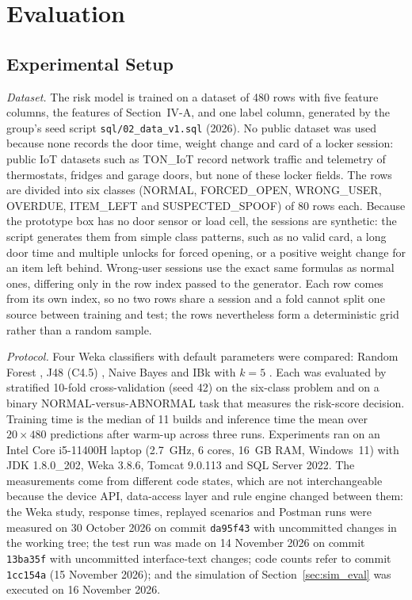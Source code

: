 \documentclass[journal,onecolumn]{IEEEtran}
\newcommand{\baselinecommit}{da95f43}
\newcommand{\revisioncommit}{1cc154a}
\begin{document}
\section{Evaluation}
\label{sec:ml}

\subsection{Experimental Setup}

\textit{Dataset.} The risk model is trained on a dataset of 480 rows with five feature columns, the features of
Section~IV-A, and one label column, generated by the group's seed script \texttt{sql/02\_data\_v1.sql} (2026). No
public dataset was used because none records the door time, weight change and card of a locker session: public IoT
datasets such as TON\_IoT \cite{moustafa2021toniot} record network traffic and telemetry of thermostats, fridges and
garage doors, but none of these locker fields. The rows are divided into six classes (NORMAL, FORCED\_OPEN,
WRONG\_USER, OVERDUE, ITEM\_LEFT and SUSPECTED\_SPOOF) of 80 rows each. Because the prototype box has no door sensor or
load cell, the sessions are synthetic: the script generates them from simple class patterns, such as no valid card, a
long door time and multiple unlocks for forced opening, or a positive weight change for an item left behind. Wrong-user
sessions use the exact same formulas as normal ones, differing only in the row index passed to the generator. Each
row comes from its own index, so no two rows share a session and a fold cannot split one source between training and
test; the rows nevertheless form a deterministic grid rather than a random sample.

\textit{Protocol.} Four Weka classifiers with default parameters were compared: Random Forest \cite{breiman2001rf},
J48 (C4.5) \cite{quinlan1993c45}, Naive Bayes \cite{john1995nb} and IBk with $k = 5$ \cite{aha1991ibl}. Each was
evaluated by stratified 10-fold cross-validation \cite{kohavi1995cv} (seed 42) on the six-class problem and on a binary
NORMAL-versus-ABNORMAL task that measures the risk-score decision. Training time is the median of 11 builds and
inference time the mean over $20 \times 480$ predictions after warm-up across three runs. Experiments ran on an Intel
Core i5-11400H laptop (2.7~GHz, 6 cores, 16~GB RAM, Windows~11) with JDK 1.8.0\_202, Weka 3.8.6, Tomcat 9.0.113 and SQL
Server 2022. The measurements come from different code states, which are not interchangeable because the device API,
data-access layer and rule engine changed between them: the Weka study, response times, replayed scenarios and Postman
runs were measured on 30 October 2026 on commit \texttt{\baselinecommit} with uncommitted changes in the working tree;
the test run was made on 14 November 2026 on commit \texttt{13ba35f} with uncommitted interface-text changes; code
counts refer to commit \texttt{\revisioncommit} (15 November 2026); and the simulation of Section~\ref{sec:sim_eval}
was executed on 16 November 2026.
\end{document}
